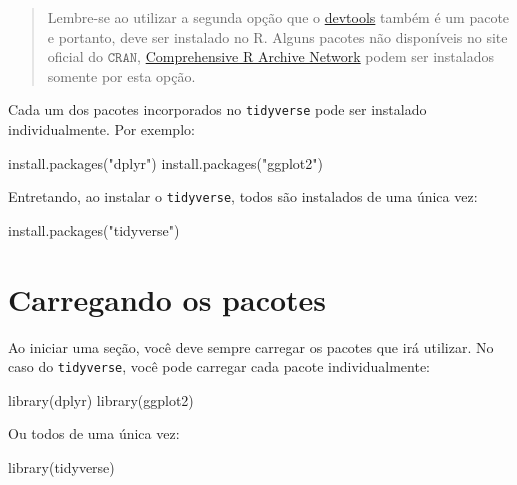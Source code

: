 \documentclass[
]{book}
\newenvironment{Shaded}{\begin{snugshade}}{\end{snugshade}}
\newcommand{\FunctionTok}[1]{\textcolor[rgb]{0.00,0.00,0.00}{#1}}
\newcommand{\NormalTok}[1]{#1}
\newcommand{\StringTok}[1]{\textcolor[rgb]{0.31,0.60,0.02}{#1}}
\begin{document}
\begin{quote}
Lembre-se ao utilizar a segunda opção que o \href{https://cran.r-project.org/web/packages/devtools/index.html}{devtools} também é um pacote e portanto, deve ser instalado no R. Alguns pacotes não disponíveis no site oficial do \(\texttt{CRAN}\), \href{https://cran.r-project.org/}{Comprehensive R Archive Network} podem ser instalados somente por esta opção.
\end{quote}

Cada um dos pacotes incorporados no \texttt{tidyverse} pode ser instalado individualmente. Por exemplo:

\begin{Shaded}
\begin{Highlighting}[]
\FunctionTok{install.packages}\NormalTok{(}\StringTok{"dplyr"}\NormalTok{)}
\FunctionTok{install.packages}\NormalTok{(}\StringTok{"ggplot2"}\NormalTok{)}
\end{Highlighting}
\end{Shaded}

Entretando, ao instalar o \texttt{tidyverse}, todos são instalados de uma única vez:

\begin{Shaded}
\begin{Highlighting}[]
\FunctionTok{install.packages}\NormalTok{(}\StringTok{"tidyverse"}\NormalTok{)}
\end{Highlighting}
\end{Shaded}

\hypertarget{carregando-os-pacotes}{%
\section{Carregando os pacotes}\label{carregando-os-pacotes}}

Ao iniciar uma seção, você deve sempre carregar os pacotes que irá utilizar. No caso do \texttt{tidyverse}, você pode carregar cada pacote individualmente:

\begin{Shaded}
\begin{Highlighting}[]
\FunctionTok{library}\NormalTok{(dplyr)}
\FunctionTok{library}\NormalTok{(ggplot2)}
\end{Highlighting}
\end{Shaded}

Ou todos de uma única vez:

\begin{Shaded}
\begin{Highlighting}[]
\FunctionTok{library}\NormalTok{(tidyverse)}
\end{Highlighting}
\end{Shaded}
\end{document}
